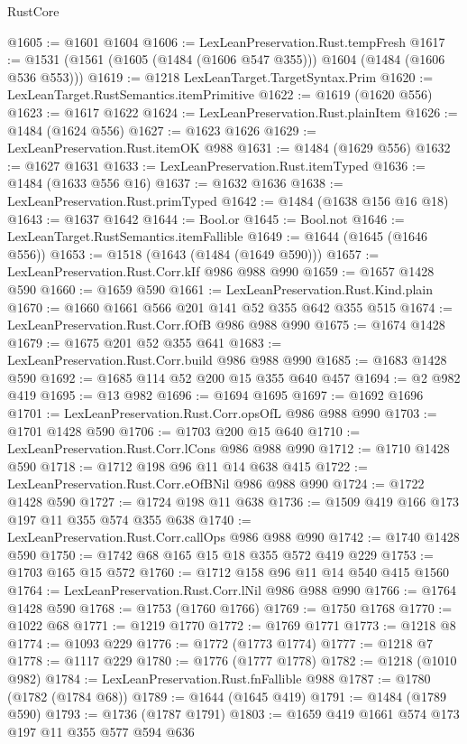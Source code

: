 \begin{lexlean}{RustCore}
\begin{coremodule}
@1605 := @1601 @1604
@1606 := LexLeanPreservation.Rust.tempFresh
@1617 := @1531 (@1561 (@1605 (@1484 (@1606 @547 @355))) @1604 (@1484 (@1606 @536 @553)))
@1619 := @1218 LexLeanTarget.TargetSyntax.Prim
@1620 := LexLeanTarget.RustSemantics.itemPrimitive
@1622 := @1619 (@1620 @556)
@1623 := @1617 @1622
@1624 := LexLeanPreservation.Rust.plainItem
@1626 := @1484 (@1624 @556)
@1627 := @1623 @1626
@1629 := LexLeanPreservation.Rust.itemOK @988
@1631 := @1484 (@1629 @556)
@1632 := @1627 @1631
@1633 := LexLeanPreservation.Rust.itemTyped
@1636 := @1484 (@1633 @556 @16)
@1637 := @1632 @1636
@1638 := LexLeanPreservation.Rust.primTyped
@1642 := @1484 (@1638 @156 @16 @18)
@1643 := @1637 @1642
@1644 := Bool.or
@1645 := Bool.not
@1646 := LexLeanTarget.RustSemantics.itemFallible
@1649 := @1644 (@1645 (@1646 @556))
@1653 := @1518 (@1643 (@1484 (@1649 @590)))
@1657 := LexLeanPreservation.Rust.Corr.kIf @986 @988 @990
@1659 := @1657 @1428 @590
@1660 := @1659 @590
@1661 := LexLeanPreservation.Rust.Kind.plain
@1670 := @1660 @1661 @566 @201 @141 @52 @355 @642 @355 @515
@1674 := LexLeanPreservation.Rust.Corr.fOfB @986 @988 @990
@1675 := @1674 @1428
@1679 := @1675 @201 @52 @355 @641
@1683 := LexLeanPreservation.Rust.Corr.build @986 @988 @990
@1685 := @1683 @1428 @590
@1692 := @1685 @114 @52 @200 @15 @355 @640 @457
@1694 := @2 @982 @419
@1695 := @13 @982
@1696 := @1694 @1695
@1697 := @1692 @1696
@1701 := LexLeanPreservation.Rust.Corr.opsOfL @986 @988 @990
@1703 := @1701 @1428 @590
@1706 := @1703 @200 @15 @640
@1710 := LexLeanPreservation.Rust.Corr.lCons @986 @988 @990
@1712 := @1710 @1428 @590
@1718 := @1712 @198 @96 @11 @14 @638 @415
@1722 := LexLeanPreservation.Rust.Corr.eOfBNil @986 @988 @990
@1724 := @1722 @1428 @590
@1727 := @1724 @198 @11 @638
@1736 := @1509 @419 @166 @173 @197 @11 @355 @574 @355 @638
@1740 := LexLeanPreservation.Rust.Corr.callOps @986 @988 @990
@1742 := @1740 @1428 @590
@1750 := @1742 @68 @165 @15 @18 @355 @572 @419 @229
@1753 := @1703 @165 @15 @572
@1760 := @1712 @158 @96 @11 @14 @540 @415 @1560
@1764 := LexLeanPreservation.Rust.Corr.lNil @986 @988 @990
@1766 := @1764 @1428 @590
@1768 := @1753 (@1760 @1766)
@1769 := @1750 @1768
@1770 := @1022 @68
@1771 := @1219 @1770
@1772 := @1769 @1771
@1773 := @1218 @8
@1774 := @1093 @229
@1776 := @1772 (@1773 @1774)
@1777 := @1218 @7
@1778 := @1117 @229
@1780 := @1776 (@1777 @1778)
@1782 := @1218 (@1010 @982)
@1784 := LexLeanPreservation.Rust.fnFallible @988
@1787 := @1780 (@1782 (@1784 @68))
@1789 := @1644 (@1645 @419)
@1791 := @1484 (@1789 @590)
@1793 := @1736 (@1787 @1791)
@1803 := @1659 @419 @1661 @574 @173 @197 @11 @355 @577 @594 @636

\end{coremodule}
\end{lexlean}
